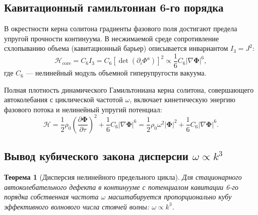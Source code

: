 \documentclass[12pt,a4paper]{article}
\newtheorem{theorem}{Теорема}
\begin{document}
	\subsection{Кавитационный гамильтониан 6-го порядка}
	В окрестности керна солитона градиенты фазового поля достигают предела упругой прочности континуума. В несжимаемой среде сопротивление схлопыванию объема (кавитационный барьер) описывается инвариантом $I_3 = J^2$:
	\begin{equation}
		\mathcal{H}_{\text{core}} = C_6 I_3 = C_6 \left[ \det\left(\partial_i \Phi^a\right) \right]^2 \propto \frac{1}{6} C_6 |\nabla \boldsymbol{\Phi}|^6,
	\end{equation}
	где $C_6$ --- нелинейный модуль объемной гиперупругости вакуума.
	
	Полная плотность динамического Гамильтониана керна солитона, совершающего автоколебания с циклической частотой $\omega$, включает кинетическую энергию фазового потока и нелинейный упругий потенциал:
	\begin{equation}
		\mathcal{H} = \frac{1}{2} \rho_0 \left( \frac{\partial \boldsymbol{\Phi}}{\partial \tau} \right)^2 + \frac{1}{6} C_6 |\nabla \boldsymbol{\Phi}|^6 = \frac{1}{2} \rho_0 \omega^2 |\boldsymbol{\Phi}|^2 + \frac{1}{6} C_6 |\nabla \boldsymbol{\Phi}|^6.
	\end{equation}
	
	\subsection{Вывод кубического закона дисперсии $\omega \propto k^3$}
	\begin{theorem}[Дисперсия нелинейного предельного цикла]
		Для стационарного автоколебательного дефекта в континууме с потенциалом кавитации 6-го порядка собственная частота $\omega$ масштабируется пропорционально кубу эффективного волнового числа стоячей волны: $\omega \propto k^3$.
	\end{theorem}
	
\end{document}
